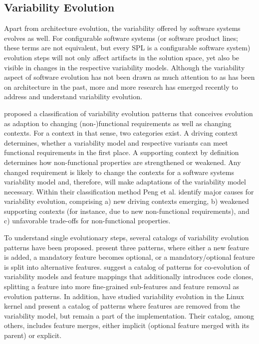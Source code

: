 \subsection{Variability Evolution}
Apart from architecture evolution, the variability offered by software systems
evolves as well. For configurable software systems (or software product lines; 
these terms are not equivalent, but every SPL is a configurable software system)
evolution steps will not only affect artifacts in the solution space, yet also be visible in changes in the respective variability models.
Although the variability aspect of software evolution has not been drawn as
much attention to as has been on architecture in the past, more and more
research has emerged recently to address and understand variability evolution.

\cite{peng_analyzing_2011} proposed a classification of variability evolution patterns that
conceives evolution as adaption to changing (non-)functional requirements as
well as changing contexts. For a context in that sense, two
categories exist. A driving context determines, whether a variability model and respective variants
can meet functional requirements in the first place. A supporting context by
definition determines how non-functional properties are strengthened or
weakened. Any changed requirement is likely to change the contexts for a
software systems variability model and, therefore, will make adaptations of the
variability model necessary. Within their classification method Peng et al.
identify  major causes for variability evolution, comprising a) new driving
contexts emerging, b) weakened supporting contexts (for instance, due to new
non-functional requirements), and c) unfavorable trade-offs for non-functional
properties. 

To understand single evolutionary steps, several catalogs of variability
evolution patterns have been proposed. \cite{peng_analyzing_2011} present three patterns,
where either a new feature is added, a mandatory feature becomes optional, or a
mandatory/optional feature is split into alternative features. \cite{seidl_co-evolution_2012} suggest a catalog of
patterns for co-evolution of variability models and feature mappings that additionally introduces code clones, splitting a feature
into more fine-grained sub-features and feature removal as evolution patterns.
In addition, \cite{passos_towards_2012} have studied variability evolution in
the Linux kernel and present a catalog of patterns where features are removed from the
variability model, but remain a part of the implementation. Their
catalog, among others, includes feature merges, either implicit (optional feature merged
with its parent) or explicit.

